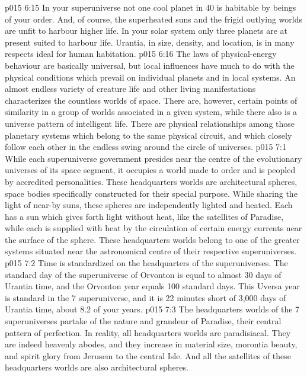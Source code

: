 \vs p015 6:15 In your superuniverse not one cool planet in 40 is habitable by beings of your order. And, of course, the superheated suns and the frigid outlying worlds are unfit to harbour higher life. In your solar system only three planets are at present suited to harbour life. Urantia, in size, density, and location, is in many respects ideal for human habitation.
\vs p015 6:16 The laws of physical\hyp{}energy behaviour are basically universal, but local influences have much to do with the physical conditions which prevail on individual planets and in local systems. An almost endless variety of creature life and other living manifestations characterizes the countless worlds of space. There are, however, certain points of similarity in a group of worlds associated in a given system, while there also is a universe pattern of intelligent life. There are physical relationships among those planetary systems which belong to the same physical circuit, and which closely follow each other in the endless swing around the circle of universes.
\vs p015 7:1 While each superuniverse government presides near the centre of the evolutionary universes of its space segment, it occupies a world made to order and is peopled by accredited personalities. These headquarters worlds are architectural spheres, space bodies specifically constructed for their special purpose. While sharing the light of near\hyp{}by suns, these spheres are independently lighted and heated. Each has a sun which gives forth light without heat, like the satellites of Paradise, while each is supplied with heat by the circulation of certain energy currents near the surface of the sphere. These headquarters worlds belong to one of the greater systems situated near the astronomical centre of their respective superuniverses.
\vs p015 7:2 \pc Time is standardized on the headquarters of the superuniverses. The standard day of the superuniverse of Orvonton is equal to almost 30 days of Urantia time, and the Orvonton year equals 100 standard days. This Uversa year is standard in the 7 superuniverse, and it is 22 minutes short of 3,000 days of Urantia time, about 8.2 of your years.
\vs p015 7:3 \pc The headquarters worlds of the 7 superuniverses partake of the nature and grandeur of Paradise, their central pattern of perfection. In reality, all headquarters worlds are paradisiacal. They are indeed heavenly abodes, and they increase in material size, morontia beauty, and spirit glory from Jerusem to the central Isle. And all the satellites of these headquarters worlds are also architectural spheres.
